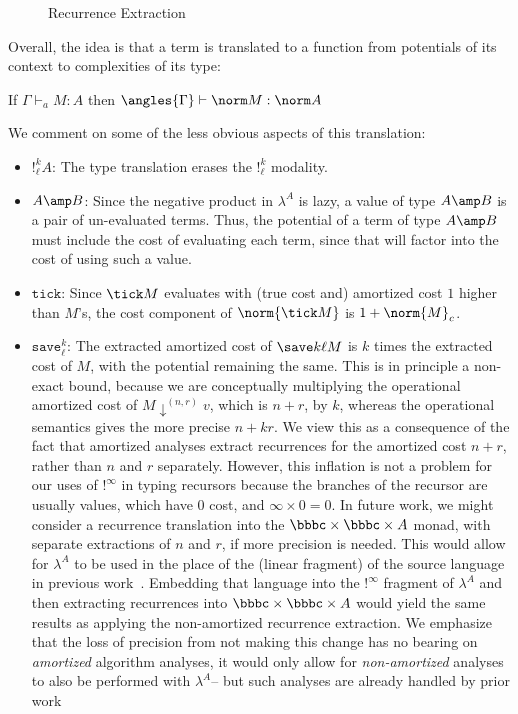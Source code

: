 \begin{figure}
  
  \caption{Recurrence Extraction}
  \label{fig:rec-extr}
\end{figure}

Overall, the idea is that a term is translated to a function from
potentials of its context to complexities of its type:
\begin{theorem}\label{thm:extr-sound}
If $\Gamma \vdash_a M : A$ then $\angles{\Gamma} \vdash \norm M : \norm A$
\end{theorem}

We comment on some of the less obvious aspects of this translation:

\begin{itemize}
  \item $!^k_\ell A$: The type translation erases the $!^k_\ell$ modality. 
  
  \item $A \amp B$: Since the negative product in $\lambda^A$ is lazy, a
    value of type $A \amp B$ is a pair of un-evaluated terms. Thus, the
    potential of a term of type $A \amp B$ must include the cost of
    evaluating each term, since that will factor into the cost of
    using such a value.
  
  \item $\texttt{tick}$: Since $\tick M$ evaluates with (true cost and)
    amortized cost $1$ higher than $M$'s, the cost component of
    $\norm{\tick M}$ is $1 + \norm{M}_c$.

  \item $\texttt{save}^k_\ell$: The extracted amortized cost of $\save k
    \ell M$ is $k$ times the extracted cost of $M$, with the potential
    remaining the same.  This is in principle a non-exact bound, because we
    are conceptually multiplying the operational amortized cost of $M
    \downarrow^{(n,r)} v$, which is $n + r$, by $k$, whereas the
    operational semantics gives the more precise $n + k r$.  We view
    this as a consequence of the fact that amortized analyses extract
    recurrences for the amortized cost $n+r$, rather than $n$ and $r$
    separately. However, this inflation is not a
    problem for our uses of $!^\infty$ in typing recursors because the
    branches of the recursor are usually values, which have 0 cost, and
    $\infty \times 0 = 0$. In future work, we might consider a recurrence
    translation into the $\bbbc \times \bbbc \times A$ monad, with
    separate extractions of $n$ and $r$, if more precision is needed.
    This would allow for $\lambda^A$ to be used in the place of the
    (linear fragment) of the source language in previous 
    work~\cite{danner-et-al:icfp15}. Embedding that language into the $!^\infty$
    fragment of $\lambda^A$ and then extracting recurrences into 
    $\bbbc \times \bbbc \times A$ would yield the same results as
    applying the non-amortized recurrence extraction. We emphasize
    that the loss of precision from not making this change has no bearing
    on \textit{amortized} algorithm analyses, it would only
    allow for \textit{non-amortized} analyses to also be performed
    with $\lambda^A$-- but such analyses are already handled by prior work \cite{danner-et-al:icfp15,kavvos-et-al:popl20}
    

\end{itemize}
